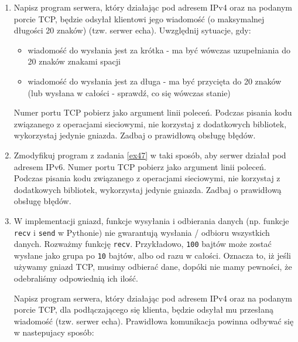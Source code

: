 \documentclass{article}
\begin{document}
\begin{enumerate}[label=\textbf{4.\arabic*}]

\item \label{ex47} Napisz program serwera, który działając  pod adresem IPv4 oraz na podanym porcie TCP, będzie odsyłał klientowi jego wiadomość (o maksymalnej długości 20 znaków) (tzw. serwer echa).  Uwzględnij sytuacje, gdy:

\begin{itemize}
\item wiadomość do wysłania jest za krótka - ma być wówczas uzupełniania do 20 znaków znakami spacji
\item wiadomość do wysłania jest za długa - ma być przycięta do 20 znaków (lub wysłana w całości - sprawdź, co się wówczas stanie)
\end{itemize}

\noindent Numer portu TCP pobierz jako argument linii poleceń. Podczas pisania kodu związanego z operacjami sieciowymi, nie korzystaj z dodatkowych bibliotek, wykorzystaj jedynie gniazda. Zadbaj o prawidłową obsługę błędów.

\item Zmodyfikuj program z zadania \ref{ex47} w taki sposób,  aby serwer działał pod adresem IPv6.   Numer portu TCP pobierz jako argument linii poleceń. Podczas pisania kodu związanego z operacjami sieciowymi, nie korzystaj z dodatkowych bibliotek, wykorzystaj jedynie gniazda. Zadbaj o prawidłową obsługę błędów.


\item  \label{ex49} W implementacji gniazd, funkcje wysyłania i odbierania danych (np. funkcje \texttt{recv} i \texttt{send} w Pythonie) nie gwarantują wysłania / odbioru wszystkich danych. Rozważmy funkcję \texttt{recv}. Przykładowo, \texttt{100} bajtów może zostać wysłane jako grupa po \texttt{10} bajtów, albo od razu w całości. Oznacza to, iż jeśli używamy gniazd TCP, musimy odbierać dane, dopóki nie mamy pewności, że odebraliśmy odpowiednią ich ilość.

Napisz program serwera, który działając  pod adresem IPv4 oraz na podanym porcie TCP, dla podłączającego się klienta, będzie odsyłał mu przesłaną wiadomość (tzw. serwer echa). Prawidłowa komunikacja powinna odbywać się w nastepujacy sposób:


\end{enumerate}
\end{document}

